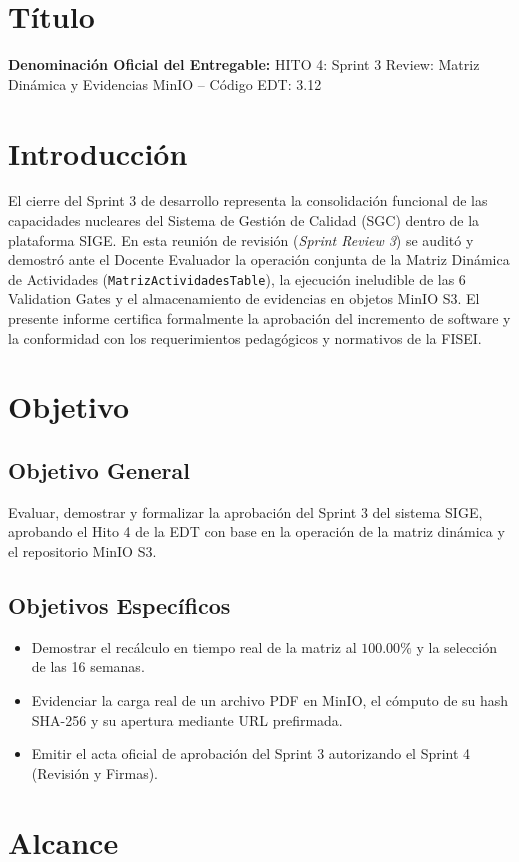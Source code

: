 \documentclass[12pt,a4paper]{article}
\begin{document}
\section{Título}
\textbf{Denominación Oficial del Entregable:} HITO 4: Sprint 3 Review: Matriz Dinámica y Evidencias MinIO -- Código EDT: 3.12

\section{Introducción}
El cierre del Sprint 3 de desarrollo representa la consolidación funcional de las capacidades nucleares del Sistema de Gestión de Calidad (SGC) dentro de la plataforma SIGE. En esta reunión de revisión (\textit{Sprint Review 3}) se auditó y demostró ante el Docente Evaluador la operación conjunta de la Matriz Dinámica de Actividades (\texttt{MatrizActividadesTable}), la ejecución ineludible de las 6 Validation Gates y el almacenamiento de evidencias en objetos MinIO S3. El presente informe certifica formalmente la aprobación del incremento de software y la conformidad con los requerimientos pedagógicos y normativos de la FISEI.

\section{Objetivo}
\subsection{Objetivo General}
Evaluar, demostrar y formalizar la aprobación del Sprint 3 del sistema SIGE, aprobando el Hito 4 de la EDT con base en la operación de la matriz dinámica y el repositorio MinIO S3.
\subsection{Objetivos Específicos}
\begin{itemize}[leftmargin=1.5em, itemsep=2pt]
    \item Demostrar el recálculo en tiempo real de la matriz al $100.00\%$ y la selección de las 16 semanas.
    \item Evidenciar la carga real de un archivo PDF en MinIO, el cómputo de su hash SHA-256 y su apertura mediante URL prefirmada.
    \item Emitir el acta oficial de aprobación del Sprint 3 autorizando el Sprint 4 (Revisión y Firmas).
\end{itemize}

\section{Alcance}
\end{document}

